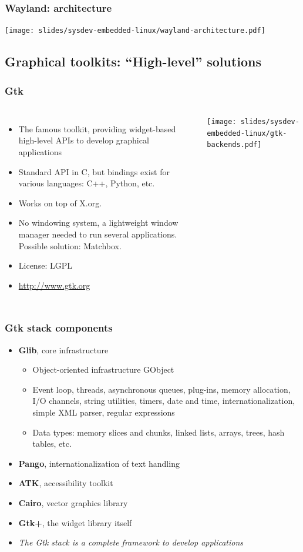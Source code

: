\begin{frame}
  \frametitle{Wayland: architecture}
  \begin{center}
    \texttt{[image: slides/sysdev-embedded-linux/wayland-architecture.pdf]}
  \end{center}
\end{frame}


\subsection[High-level Toolkits]{Graphical toolkits: ``High-level''
  solutions}

\begin{frame}
  \frametitle{Gtk}
  \begin{columns}
    \begin{itemize}
    \item The famous toolkit, providing widget-based high-level APIs to
      develop graphical applications
    \item Standard API in C, but bindings exist for various languages:
      C++, Python, etc.
    \item Works on top of X.org.
    \item No windowing system, a lightweight window manager needed to
      run several applications. Possible solution: Matchbox.
    \item License: LGPL
    \item \url{http://www.gtk.org}
    \end{itemize}
    \texttt{[image: slides/sysdev-embedded-linux/gtk-backends.pdf]}
  \end{columns}
\end{frame}

\begin{frame}
  \frametitle{Gtk stack components}
  \begin{itemize}
  \item {\bf Glib}, core infrastructure
    \begin{itemize}
    \item Object-oriented infrastructure GObject
    \item Event loop, threads, asynchronous queues, plug-ins, memory
      allocation, I/O channels, string utilities, timers, date and
      time, internationalization, simple XML parser, regular
      expressions
    \item Data types: memory slices and chunks, linked lists, arrays,
      trees, hash tables, etc.
    \end{itemize}
  \item {\bf Pango}, internationalization of text handling
  \item {\bf ATK}, accessibility toolkit
  \item {\bf Cairo}, vector graphics library
  \item {\bf Gtk+}, the widget library itself
  \item {\em The Gtk stack is a complete framework to develop applications}
  \end{itemize}
\end{frame}


